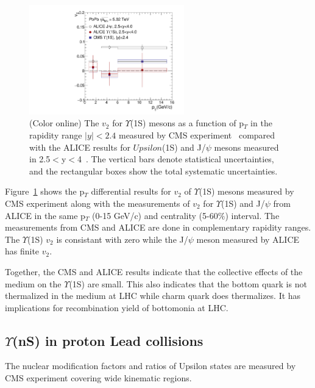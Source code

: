 \begin{figure}
  \begin{center}
\includegraphics[width=0.6\textwidth]{Figures/Fig11_CMS_ALICE_Y1S_5TeV_V2.pdf}
\caption{(Color online) The $v_{2}$ for $\Upsilon$(1S) mesons as a function of p$_{T}$ in the
  rapidity range $|y|<2.4$ measured by
  CMS experiment~\cite{CMS:2020efs} compared with the ALICE results for $Upsilon$(1S)
  and J/$\psi$ mesons measured in 2.5$<$y$<$4~\cite{ALICE:2019pox}.
  The vertical bars denote statistical uncertainties,
  and the rectangular boxes show the total systematic uncertainties.
}
\label{fig:Upsilon1SV2Compare}
\end{center}
\end{figure}

Figure~\ref{fig:Upsilon1SV2Compare} shows the p$_{T}$ differential results
for $v_{2}$ of $\Upsilon$(1S) mesons measured by CMS experiment along with the
measurements of $v_{2}$ for $\Upsilon$(1S) and J/$\psi$ from ALICE in the same
p$_{T}$ (0-15 GeV/c) and centrality (5-60$\%$) interval. The measurements from CMS
and ALICE are done in complementary rapidity ranges. The $\Upsilon$(1S) $v_{2}$ is
consistant with zero while the J/$\psi$ meson measured by ALICE 
has finite $v_{2}$.

Together, the CMS and ALICE
results indicate that the collective effects of the medium on the 
$\Upsilon$(1S) are small. This also indicates that the bottom quark is not
thermalized in the medium at LHC while charm quark does thermalizes. It has
implications for recombination yield of bottomonia at LHC. 



\subsection{$\Upsilon$(nS) in proton Lead collisions }
\label{sectionpA}

The nuclear modification factors and ratios of Upsilon states are measured by CMS
experiment covering wide kinematic regions.

